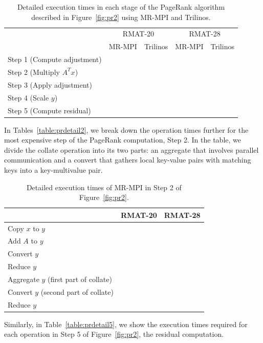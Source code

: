 \begin{table}[htb]
\begin{center}
\begin{tabular}{|l|r|r|r|r|}
\hline 
 & \multicolumn{2}{|c|}{RMAT-20} & \multicolumn{2}{|c|}{RMAT-28} \\
 & MR-MPI & Trilinos & MR-MPI & Trilinos  \\
\hline
Step 1 (Compute adjustment) & & & &  \\
Step 2 (Multiply $A^T x$) & & & &  \\
Step 3 (Apply adjustment) & & & &  \\
Step 4 (Scale $y$)  & & & & \\
Step 5 (Compute residual)  & & & & \\
\hline
\end{tabular}
\caption{Detailed execution times in each stage of the PageRank algorithm
described in Figure~\ref{fig:pr2} using MR-MPI and Trilinos.}
\label{table:prdetail}
\end{center}
\end{table}


In Tables~\ref{table:prdetail2},
we break down the operation times further for the most expensive 
step of the PageRank computation, Step 2.
In the table, we divide the collate operation into its
two parts:  an aggregate that involves parallel communication and a convert
that gathers local key-value pairs with matching keys into a key-multivalue
pair.

\begin{table}[htb]
\begin{center}
\begin{tabular}{|l|r|r|}
\hline 
 & RMAT-20 & RMAT-28 \\
\hline
Copy $x$ to $y$ & &  \\
Add $A$ to $y$ & &  \\
Convert $y$ & &  \\
Reduce $y$ & & \\
Aggregate $y$ (first part of collate) & & \\
Convert $y$ (second part of collate) & & \\
Reduce $y$ & & \\
\hline
\end{tabular}
\caption{Detailed execution times of MR-MPI in Step 2 of 
Figure~\ref{fig:pr2}.}
\label{table:prdetial2}
\end{center}
\end{table}

Similarly, in Table~\ref{table:prdetail5}, we show the execution times 
required for each operation in Step 5 of Figure~\ref{fig:pr2}, the 
residual computation.  

